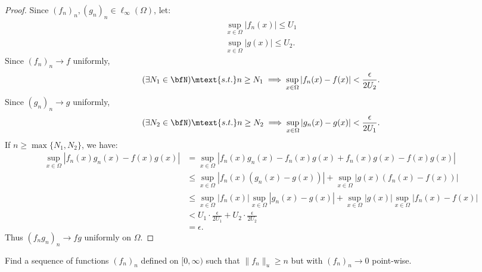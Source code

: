 \documentclass[10pt,twoside,openany]{memoir}
\begin{document}
        \begin{proof}
            Since $(f_n)_n,(g_n)_n \in \ell_\infty(\Omega)$, let:
                \begin{equation*}
                \begin{split}
                    \sup_{x \in \Omega}|f_n(x)| \leq U_1 \\
                    \sup_{x \in \Omega}|g(x)| \leq U_2.
                \end{split}
                \end{equation*}
            Since $(f_n)_n \rightarrow f$ uniformly,
                \begin{equation*}
                \begin{split}
                    (\exists N_1 \in \bfN)\mtext{s.t.}n \geq N_1 \implies \sup_{x \in \Omega}|f_n(x) - f(x)| < \frac{\epsilon}{2U_2}.
                \end{split}
                \end{equation*}
            Since $(g_n)_n \rightarrow g$ uniformly,
                \begin{equation*}
                \begin{split}
                    (\exists N_2 \in \bfN)\mtext{s.t.}n \geq N_2 \implies \sup_{x \in \Omega}|g_n(x) - g(x)| < \frac{\epsilon}{2U_1}.
                \end{split}
                \end{equation*}
            If $n \geq \max\{N_1,N_2\}$, we have:
                \begin{equation*}
                \begin{split}
                    \sup_{x \in \Omega}|f_n(x)g_n(x) - f(x)g(x)|
                    & = \sup_{x \in \Omega}|f_n(x)g_n(x) - f_n(x)g(x) + f_n(x)g(x) - f(x)g(x)| \\
                    & \leq \sup_{x \in \Omega}|f_n(x)(g_n(x) - g(x))| + \sup_{x \in \Omega}|g(x)(f_n(x) - f(x))| \\
                    & \leq \sup_{x \in \Omega}|f_n(x)|\sup_{x \in \Omega}|g_n(x) - g(x)| + \sup_{x \in \Omega}|g(x)|\sup_{x \in \Omega}|f_n(x) - f(x)| \\
                    &< U_1 \cdot \frac{\epsilon}{2U_1} + U_2 \cdot \frac{\epsilon}{2U_2} \\
                    & = \epsilon.
                \end{split}
                \end{equation*}
            Thus $(f_n g_n)_n \rightarrow fg$ uniformly on $\Omega$.
        \end{proof}
    \begin{exercise}
        Find a sequence of functions $(f_n)_n$ defined on $[0,\infty)$ such that $\lVert f_n\rVert _u \geq n$ but with $(f_n)_n \rightarrow 0$ point-wise.
    \end{exercise}
\end{document}
